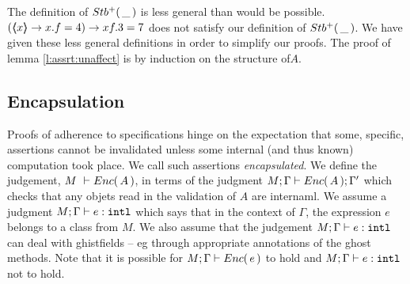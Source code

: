 %

The definition  of ${Stb^+(\, \_\, )}$
is  less  general than would be   possible. \Eg $(\langle\!\!\langle x \rangle\!\!\rangle \rightarrow  x.f=4) \rightarrow xf.3=7$  does not satisfy our definition of ${Stb^+(\, \_\, )}$.
We have given these less general definitions in order to simplify our proofs.
The proof of lemma \ref{l:assrt:unaffect} is by induction on the structure of$A$.

\subsection{Encapsulation}

{
Proofs of adherence to {\SpecLang specifications  hinge on the expectation that some, 
specific, assertions cannot be invalidated unless some 
} internal (and thus known) computation took place. 
{We call such assertions   \emph{encapsulated}.}
}
We define the  judgement,  $M\ \vdash  {\ensuremath Enc(\, A\, )}$, in terms of the judgment  $M; \Gamma \vdash {\ensuremath Enc(\, A\, )}  ; \Gamma'$
which checks that any objets read  in the validation of $A$ are internaml.
We assume a judgment $M; \Gamma \vdash e :  \mbox{\normalfont{\texttt{intl}}}$ which says that in the context of $\Gamma$, the expression $e$ belongs to a class from $M$.
We also assume that the judgement $M; \Gamma \vdash e :  \mbox{\normalfont{\texttt{intl}}}$ can deal with ghistfields -- eg through appropriate annotations of the ghost methods.
Note that it is possible for $M; \Gamma \vdash {\ensuremath Enc(\, e\, )}$ to hold and 
$M; \Gamma \vdash  e : \mbox{\normalfont{\texttt{intl}}}$ not to hold.


